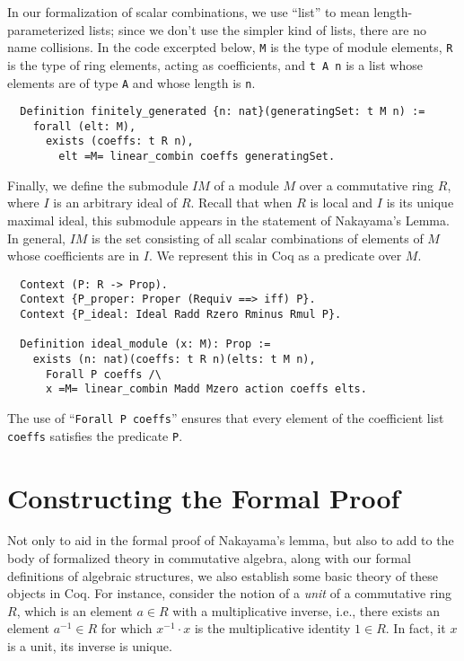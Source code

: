 \documentclass{article}
\begin{document}
In our formalization of scalar combinations, we use  ``list'' to mean
length-parameterized lists; since we don't use the simpler kind of lists, there
are no name collisions. In the code excerpted below, \texttt{M} is the type of module elements,
\texttt{R} is the type of ring elements, acting as coefficients, and
\texttt{t A n} is a list whose elements are of type \texttt{A} and whose length
is \texttt{n}.

\begin{verbatim}
  Definition finitely_generated {n: nat}(generatingSet: t M n) :=
    forall (elt: M),
      exists (coeffs: t R n),
        elt =M= linear_combin coeffs generatingSet.
\end{verbatim}

Finally, we define the submodule $IM$ of a module $M$ over a commutative ring $R$, 
where $I$ is an arbitrary ideal of $R$.
Recall that when $R$ is local and $I$ is its unique maximal ideal, this submodule 
appears in the statement of Nakayama's Lemma. 
In general, $IM$ is the set consisting of all scalar
combinations of elements of \(M\) whose coefficients are in  \(I\). We
represent this in Coq as a predicate over \(M\).

\begin{verbatim}
  Context (P: R -> Prop).
  Context {P_proper: Proper (Requiv ==> iff) P}.
  Context {P_ideal: Ideal Radd Rzero Rminus Rmul P}.
  
  Definition ideal_module (x: M): Prop :=
    exists (n: nat)(coeffs: t R n)(elts: t M n),
      Forall P coeffs /\
      x =M= linear_combin Madd Mzero action coeffs elts.
\end{verbatim}

\noindent The use of  ``\verb|Forall P coeffs|'' ensures that every element of the
coefficient list \texttt{coeffs} satisfies the predicate \texttt{P}.  

\section{Constructing the Formal Proof} \label{formal-proof: S}
Not only to aid in the formal proof of Nakayama's lemma, but also to add to the body 
of formalized theory in commutative algebra, along with our formal definitions of algebraic structures,
we also  
 establish some basic theory of these objects in Coq.
 For instance, 
consider the notion of a \emph{unit} of a
commutative ring $R$, which is an element $a \in R$ with a multiplicative inverse,
i.e., there exists an element $a^{-1} \in R$ for which $x^{-1} \cdot x$ is the
multiplicative identity $1 \in R$.  In fact, it $x$ is a unit, its inverse is unique.
\end{document}
